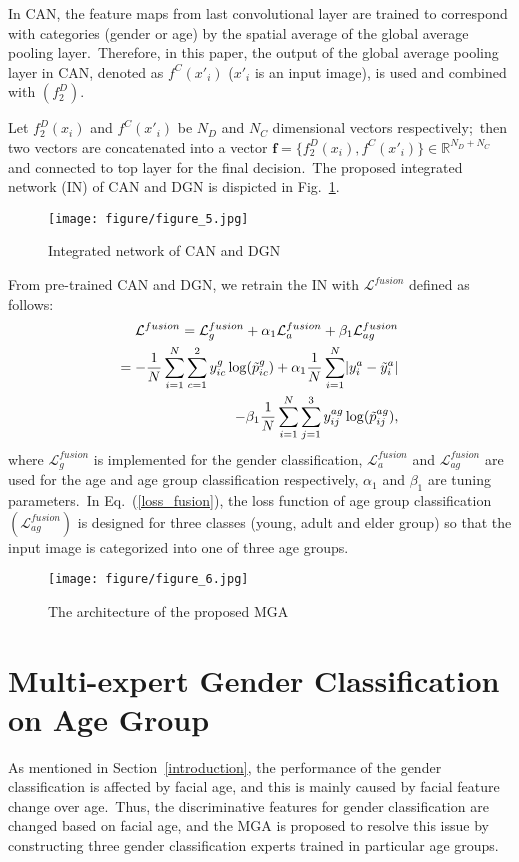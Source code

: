 \documentclass[10pt,twocolumn,letterpaper]{article}
\begin{document}
In CAN, the feature maps from last convolutional layer are trained to correspond with categories (gender or age) by the spatial average of the global average pooling layer.~Therefore, in this paper, the output of the global average pooling layer in CAN, denoted as $f^C(x'_i)$ ($x'_i$ is an input image), is used and combined with $(f_2^D)$.

Let $f_2^D(x_i)$ and $f^C(x'_i)$ be $N_D$ and $N_C$ dimensional vectors respectively;~then two vectors are concatenated into a vector $\boldsymbol{f}=\{f_2^D(x_i), f^C(x'_i)\}\in\mathbb{R}^{N_D+N_C}$ and connected to top layer for the final decision.~The proposed integrated network (IN) of CAN and DGN is dispicted in Fig.~\ref{fig:figure_5}. 

\begin{figure}[!h]
    \centering
    \texttt{[image: figure/figure\_5.jpg]}
    \caption{Integrated network of CAN and DGN}
    \label{fig:figure_5}
\end{figure}

From pre-trained CAN and DGN, we retrain the IN with $\mathcal{L}^{fusion}$ defined as follows: 
\begin{align}
\label{loss_fusion}
    \mathcal{L}^{fusion}=\mathcal{L}_g^{fusion}+\alpha_1\mathcal{L}_a^{fusion}+\beta_1\mathcal{L}_{ag}^{fusion}\nonumber\\
    =-\frac{1}{N}\sum_{i=1}^N\sum_{c=1}^2y_{ic}^g\log(\Tilde{p}_{ic}^g)+\alpha_1\frac{1}{N}\sum_{i=1}^N\lvert y_i^{a}-\Tilde{y}_i^a\rvert\nonumber\\-\beta_1\frac{1}{N}\sum_{i=1}^N\sum_{j=1}^3y_{ij}^{ag}\log(\Tilde{p}^{ag}_{ij}),
\end{align}
where $\mathcal{L}^{fusion}_g$ is implemented for the gender classification, $\mathcal{L}^{fusion}_a$ and $\mathcal{L}^{fusion}_{ag}$ are used for the age and age group classification respectively, $\alpha_1$ and $\beta_1$ are tuning parameters.~In Eq.~(\ref{loss_fusion}), the loss function of age group classification $(\mathcal{L}^{fusion}_{ag})$ is designed for three classes (young, adult and elder group) so that the input image is categorized into one of three age groups.

\begin{figure*}[!ht]
    \centering
    \texttt{[image: figure/figure\_6.jpg]}
    \caption{The architecture of the proposed MGA}
    \label{fig:figure_6}
\end{figure*}

\section{Multi-expert Gender Classification on Age Group}
\label{Multi-expert Gender Classification on Age Group}
As mentioned in Section~\ref{introduction}, the performance of the gender classification is affected by facial age, and this is mainly caused by facial feature change over age.~Thus, the discriminative features for gender classification are changed based on facial age, and the MGA is proposed to resolve this issue by constructing three gender classification experts trained in particular age groups. 
\end{document}
